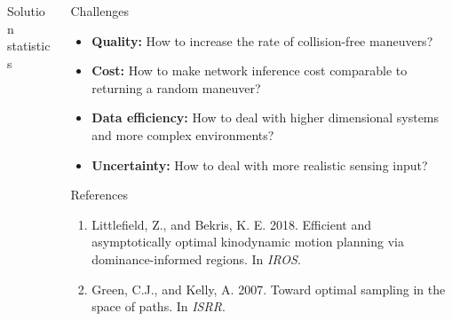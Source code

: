 \begin{columns}[t]
\begin{column}{0.68\textwidth}
\begin{block}{\large Solution statistics}
		\end{block}
	\end{column}
	\begin{column}{0.32\textwidth}
		\begin{block}{\large Challenges}
			\centering
			\begin{itemize}
				\item \textbf{Quality: } How to increase the rate of collision-free maneuvers?
				\item \textbf{Cost: } How to make network inference cost comparable to returning a random maneuver?
				\item \textbf{Data efficiency: }How to deal with higher dimensional systems and more complex environments?
				\item \textbf{Uncertainty: }How to deal with more realistic sensing input?
			\end{itemize}
		\end{block}
		\begin{block}{\large References}
			\begin{enumerate}
				\item Littlefield,  Z.,  and  Bekris,  K.  E. 2018. Efficient  and asymptotically  optimal  kinodynamic  motion  planning  via dominance-informed  regions.    In \textit{IROS}.
				\item Green, C.J., and Kelly, A.  2007.  Toward optimal sampling in the space of paths. In \textit{ISRR}.
			\end{enumerate}
		\end{block}
	\end{column}
\end{columns}